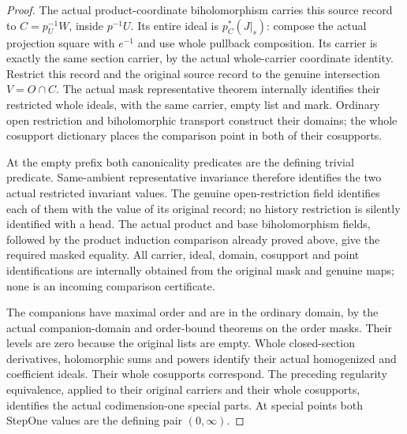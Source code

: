 \begin{proof}
The actual product-coordinate biholomorphism carries this source record to
$C=p_U^{-1}W$, inside $p^{-1}U$. Its entire ideal is $p_C^*(J|_s)$:
compose the actual projection square with $e^{-1}$ and use whole pullback
composition. Its carrier is exactly the same section carrier, by the actual
whole-carrier coordinate identity. Restrict this record and the original
source record to the genuine intersection $V=O\cap C$. The actual mask
representative theorem internally identifies their restricted whole ideals,
with the same carrier, empty list and mark. Ordinary open restriction and
biholomorphic transport construct their domains; the whole cosupport dictionary
places the comparison point in both of their cosupports.

At the empty prefix both canonicality predicates are the defining trivial
predicate. Same-ambient representative invariance therefore identifies the
two actual restricted invariant values. The genuine open-restriction field
identifies each of them with the value of its original record; no history
restriction is silently identified with a head. The actual product and base
biholomorphism fields, followed by the product induction comparison already
proved above, give the required masked equality. All carrier, ideal, domain,
cosupport and point identifications are internally obtained from the original
mask and genuine maps; none is an incoming comparison certificate.


The companions have maximal order and are in the ordinary domain, by the actual
companion-domain and order-bound theorems on the order masks. Their levels are
zero because the original lists are empty. Whole closed-section derivatives,
holomorphic sums and powers identify their actual homogenized and coefficient
ideals. Their whole cosupports correspond. The preceding regularity equivalence,
applied to their original carriers and their whole cosupports, identifies the
actual codimension-one special parts. At special points both StepOne values
are the defining pair $(0,\infty)$.


\end{proof}
